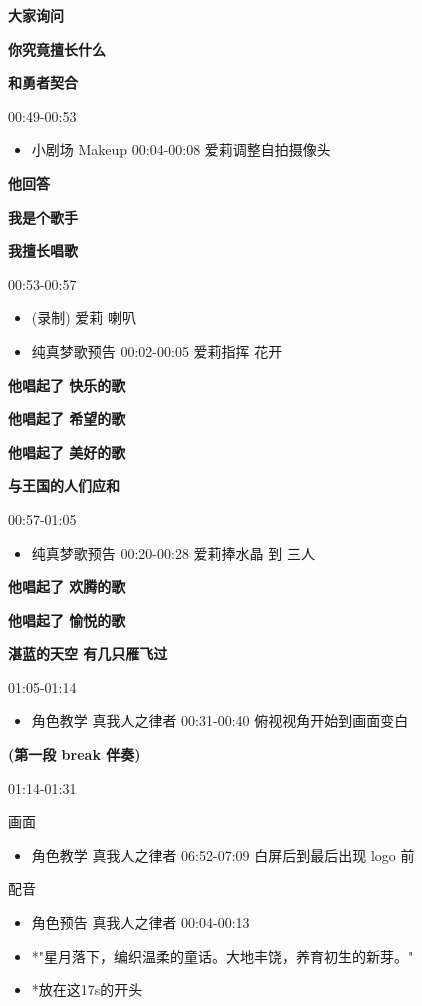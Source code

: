 \documentclass[a4paper]{article}
\begin{document}
\textbf{大家询问}

\textbf{你究竟擅长什么}

\textbf{和勇者契合}

00:49-00:53

\begin{itemize}
    \item 小剧场 Makeup 00:04-00:08 爱莉调整自拍摄像头
\end{itemize}

\textbf{他回答}

\textbf{我是个歌手}

\textbf{我擅长唱歌}

00:53-00:57

\begin{itemize}
    \item (录制) 爱莉 喇叭
    \item 纯真梦歌预告 00:02-00:05 爱莉指挥 花开
\end{itemize}

\textbf{他唱起了 快乐的歌}

\textbf{他唱起了 希望的歌}

\textbf{他唱起了 美好的歌}

\textbf{与王国的人们应和}

00:57-01:05

\begin{itemize}
    \item 纯真梦歌预告 00:20-00:28 爱莉捧水晶 到 三人
\end{itemize}

\textbf{他唱起了 欢腾的歌}

\textbf{他唱起了 愉悦的歌}

\textbf{湛蓝的天空 有几只雁飞过}

01:05-01:14

\begin{itemize}
    \item 角色教学 真我人之律者 00:31-00:40 俯视视角开始到画面变白
\end{itemize}

\textbf{(第一段 break 伴奏)}

01:14-01:31

画面

\begin{itemize}
    \item 角色教学 真我人之律者 06:52-07:09 白屏后到最后出现 logo 前
\end{itemize}

配音

\begin{itemize}
    \item 角色预告 真我人之律者 00:04-00:13
    \item *"星月落下，编织温柔的童话。大地丰饶，养育初生的新芽。"
    \item *放在这17s的开头
\end{itemize}
\end{document}
